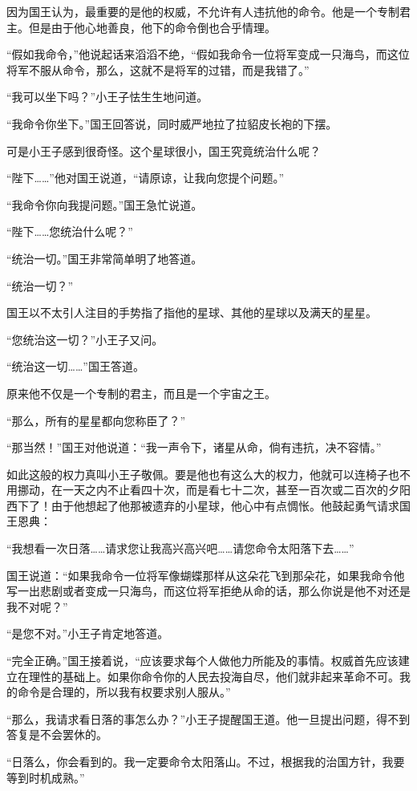 因为国王认为，最重要的是他的权威，不允许有人违抗他的命令。他是一个专制君主。但是由于他心地善良，他下的命令倒也合乎情理。

“假如我命令，”他说起话来滔滔不绝，“假如我命令一位将军变成一只海鸟，而这位将军不服从命令，那么，这就不是将军的过错，而是我错了。”

“我可以坐下吗？”小王子怯生生地问道。

“我命令你坐下。”国王回答说，同时威严地拉了拉貂皮长袍的下摆。

可是小王子感到很奇怪。这个星球很小，国王究竟统治什么呢？

“陛下\ldots{}\ldots{}”他对国王说道，“请原谅，让我向您提个问题。”

“我命令你向我提问题。”国王急忙说道。

“陛下\ldots{}\ldots{}您统治什么呢？”

“统治一切。”国王非常简单明了地答道。

“统治一切？”

国王以不太引人注目的手势指了指他的星球、其他的星球以及满天的星星。

“您统治这一切？”小王子又问。

“统治这一切\ldots{}\ldots{}”国王答道。

原来他不仅是一个专制的君主，而且是一个宇宙之王。

“那么，所有的星星都向您称臣了？”

“那当然！”国王对他说道：“我一声令下，诸星从命，倘有违抗，决不容情。”

如此这般的权力真叫小王子敬佩。要是他也有这么大的权力，他就可以连椅子也不用挪动，在一天之内不止看四十次，而是看七十二次，甚至一百次或二百次的夕阳西下了！由于他想起了他那被遗弃的小星球，他心中有点惆怅。他鼓起勇气请求国王恩典：

“我想看一次日落\ldots{}\ldots{}请求您让我高兴高兴吧\ldots{}\ldots{}请您命令太阳落下去\ldots{}\ldots{}”

国王说道：“如果我命令一位将军像蝴蝶那样从这朵花飞到那朵花，如果我命令他写一出悲剧或者变成一只海鸟，而这位将军拒绝从命的话，那么你说是他不对还是我不对呢？”

“是您不对。”小王子肯定地答道。

“完全正确。”国王接着说，“应该要求每个人做他力所能及的事情。权威首先应该建立在理性的基础上。如果你命令你的人民去投海自尽，他们就非起来革命不可。我的命令是合理的，所以我有权要求别人服从。”

“那么，我请求看日落的事怎么办？”小王子提醒国王道。他一旦提出问题，得不到答复是不会罢休的。

“日落么，你会看到的。我一定要命令太阳落山。不过，根据我的治国方针，我要等到时机成熟。”

